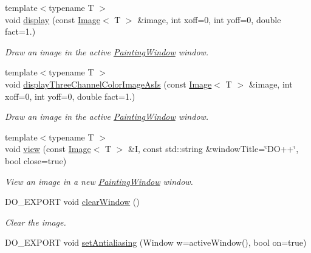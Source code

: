 \begin{DoxyCompactItemize}
{\footnotesize template$<$typename T $>$ }\\void \hyperlink{group___draw2_d_ga79613afee03373bbd813403651582f6b}{display} (const \hyperlink{class_d_o_1_1_image}{Image}$<$ T $>$ \&image, int xoff=0, int yoff=0, double fact=1.)
\begin{DoxyCompactList}\small\item\em Draw an image in the active \hyperlink{class_d_o_1_1_painting_window}{Painting\-Window} window. \end{DoxyCompactList}\item 
{\footnotesize template$<$typename T $>$ }\\void \hyperlink{group___draw2_d_gab725fb61c4c95346186b4b64c842297d}{display\-Three\-Channel\-Color\-Image\-As\-Is} (const \hyperlink{class_d_o_1_1_image}{Image}$<$ T $>$ \&image, int xoff=0, int yoff=0, double fact=1.)
\begin{DoxyCompactList}\small\item\em Draw an image in the active \hyperlink{class_d_o_1_1_painting_window}{Painting\-Window} window. \end{DoxyCompactList}\item 
\hypertarget{group___draw2_d_ga15abf15c4ccee6805650834016a512d3}{{\footnotesize template$<$typename T $>$ }\\void \hyperlink{group___draw2_d_ga15abf15c4ccee6805650834016a512d3}{view} (const \hyperlink{class_d_o_1_1_image}{Image}$<$ T $>$ \&I, const std\-::string \&window\-Title=\char`\"{}D\-O++\char`\"{}, bool close=true)}\label{group___draw2_d_ga15abf15c4ccee6805650834016a512d3}

\begin{DoxyCompactList}\small\item\em View an image in a new \hyperlink{class_d_o_1_1_painting_window}{Painting\-Window} window. \end{DoxyCompactList}\item 
\hypertarget{group___draw2_d_ga91250b6a86a927c0570061883fd5a21b}{D\-O\-\_\-\-E\-X\-P\-O\-R\-T void \hyperlink{group___draw2_d_ga91250b6a86a927c0570061883fd5a21b}{clear\-Window} ()}\label{group___draw2_d_ga91250b6a86a927c0570061883fd5a21b}

\begin{DoxyCompactList}\small\item\em Clear the image. \end{DoxyCompactList}\item 
\hypertarget{group___draw2_d_ga2eec0b5d22bc4c3d5c325e6b153657a4}{D\-O\-\_\-\-E\-X\-P\-O\-R\-T void \hyperlink{group___draw2_d_ga2eec0b5d22bc4c3d5c325e6b153657a4}{set\-Antialiasing} (Window w=active\-Window(), bool on=true)}\label{group___draw2_d_ga2eec0b5d22bc4c3d5c325e6b153657a4}


\end{DoxyCompactItemize}
